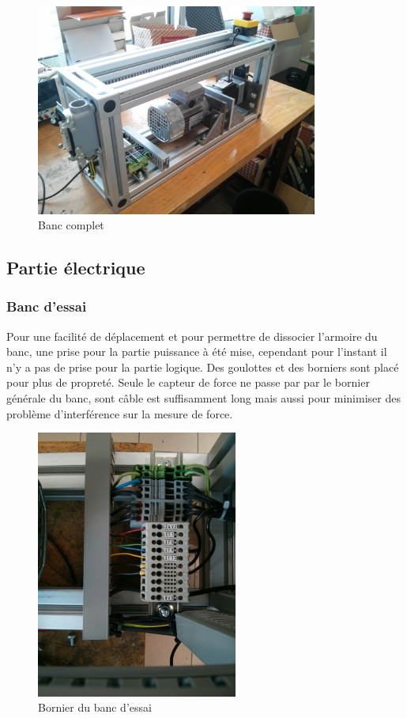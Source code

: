 \documentclass[11pt]{article}
\begin{document}
\begin{figure}[!h]
    \centering
    \includegraphics[width=350px]{IMG_20160628_183024.jpg}
    \caption{Banc complet}
\end{figure}

\subsection{Partie électrique}

\subsubsection{Banc d'essai}

Pour une facilité de déplacement et pour permettre de dissocier l'armoire du banc, une prise pour la partie puissance à été mise, cependant pour l'instant il n'y a pas de prise pour la partie logique. Des goulottes et des borniers sont placé pour plus de propreté. Seule le capteur de force ne passe par par le bornier générale du banc, sont câble est suffisamment long mais aussi pour minimiser des problème d'interférence sur la mesure de force.


\begin{figure}[!h]
    \centering
    \includegraphics[width=250px]{IMG_20160628_173723.jpg}
    \caption{Bornier du banc d'essai}
\end{figure}
\end{document}

